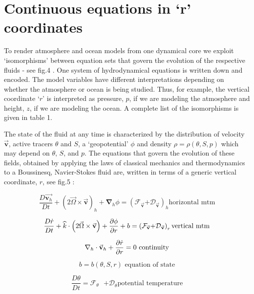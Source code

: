 
\section{Continuous equations in `r' coordinates}

To render atmosphere and ocean models from one dynamical core we exploit
`isomorphisms' between equation sets that govern the evolution of the
respective fluids - see fig.4%
. One system of hydrodynamical equations is written down
and encoded. The model variables have different interpretations depending on
whether the atmosphere or ocean is being studied. Thus, for example, the
vertical coordinate `$r$' is interpreted as pressure, $p$, if we are
modeling the atmosphere and height, $z$, if we are modeling the ocean. A
complete list of the isomorphisms is given in table 1.%

The state of the fluid at any time is characterized by the distribution of
velocity $\vec{\mathbf{v}}$, active tracers $\theta $ and $S$, a
`geopotential' $\phi $ and density $\rho =\rho (\theta ,S,p)$ which may
depend on $\theta $, $S$, and $p$. The equations that govern the evolution
of these fields, obtained by applying the laws of classical mechanics and
thermodynamics to a Boussinesq, Navier-Stokes fluid are, written in terms of
a generic vertical coordinate, $r$, see fig.5%
:

\[
\frac{D\vec{\mathbf{v}_{h}}}{Dt}+\left( 2\vec{\Omega}\times \vec{\mathbf{v}}%
\right) _{h}+\mathbf{\nabla }_{h}\phi =\left( \mathcal{F}_{\vec{\mathbf{v}}}%
\mathcal{+D}_{\vec{\mathbf{v}}}\right) _{h}\text{horizontal mtm} 
\]

\[
\frac{D\dot{r}}{Dt}+\widehat{k}\cdot \left( 2\vec{\Omega}\times \vec{\mathbf{%
v}}\right) +\frac{\partial \phi }{\partial r}+b=\left( \mathcal{F}_{\vec{%
\mathbf{v}}}\mathcal{+D}_{\vec{\mathbf{v}}}\right) _{r}\text{vertical mtm} 
\]

\begin{equation}
\mathbf{\nabla }_{h}\cdot \vec{\mathbf{v}}_{h}+\frac{\partial \dot{r}}{%
\partial r}=0\text{ continuity}  \label{incompressible}
\end{equation}

\[
b=b(\theta ,S,r)\text{ equation of state} 
\]

\[
\frac{D\theta }{Dt}=\mathcal{F}_{\theta }\text{ }\mathcal{+D}_{\theta }\text{
potential temperature} 
\]

